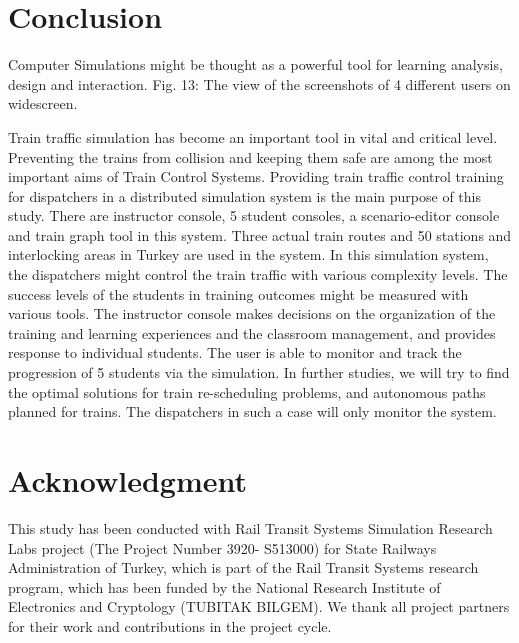 \documentclass[conference]{IEEEtran}
\begin{document}
\section{Conclusion}
Computer Simulations might be thought as a powerful tool for learning analysis, design and  interaction.
Fig.  13: The view of the screenshots of 4 different users on widescreen. 

Train traffic simulation has become an important tool in vital and critical level. Preventing the trains from collision and keeping them safe are among the most important aims of Train Control Systems.
	Providing train traffic control training for dispatchers in a distributed simulation system is the main purpose of this study. There are instructor console, 5 student consoles, a scenario-editor console and train graph tool in this system. Three actual train routes and 50 stations and interlocking areas in Turkey are used in the system. In this simulation system, the dispatchers might control the train traffic with various complexity levels. The success levels of the students in training outcomes might be measured with various tools. The instructor console makes decisions on the organization of the training and learning experiences and the classroom management, and provides response to individual students. The user is able to monitor and track the progression of 5 students via the simulation. In further studies, we will try to find the optimal solutions for train re-scheduling problems, and autonomous paths planned for trains. The dispatchers in such a case will only monitor the system.


\section*{Acknowledgment}


This study has been conducted with Rail Transit Systems Simulation Research Labs project (The Project Number 3920- S513000) for State Railways Administration of Turkey, which is part of the Rail Transit Systems research program, which has been funded by the National Research Institute of Electronics and Cryptology (TUBITAK BILGEM). We thank all project partners for their work and contributions in the project cycle.
\end{document}

